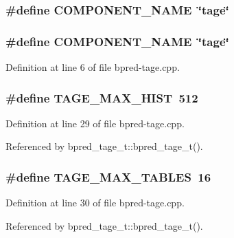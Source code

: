 \subsubsection[{COMPONENT\_\-NAME}]{\setlength{\rightskip}{0pt plus 5cm}\#define COMPONENT\_\-NAME~\char`\"{}tage\char`\"{}}\label{zesto-bpred_8cpp_9146ade7ce24e3db226a973a59063892}


\subsubsection[{COMPONENT\_\-NAME}]{\setlength{\rightskip}{0pt plus 5cm}\#define COMPONENT\_\-NAME~\char`\"{}tage\char`\"{}}\label{bpred-tage_8cpp_9146ade7ce24e3db226a973a59063892}




Definition at line 6 of file bpred-tage.cpp.
\subsubsection[{TAGE\_\-MAX\_\-HIST}]{\setlength{\rightskip}{0pt plus 5cm}\#define TAGE\_\-MAX\_\-HIST~512}\label{bpred-tage_8cpp_e832d7bb0ce985bf00711de067a6eb82}




Definition at line 29 of file bpred-tage.cpp.

Referenced by bpred\_\-tage\_\-t::bpred\_\-tage\_\-t().
\subsubsection[{TAGE\_\-MAX\_\-TABLES}]{\setlength{\rightskip}{0pt plus 5cm}\#define TAGE\_\-MAX\_\-TABLES~16}\label{bpred-tage_8cpp_dd7e74ff0d26282c083dcb5b784f6b29}




Definition at line 30 of file bpred-tage.cpp.

Referenced by bpred\_\-tage\_\-t::bpred\_\-tage\_\-t().